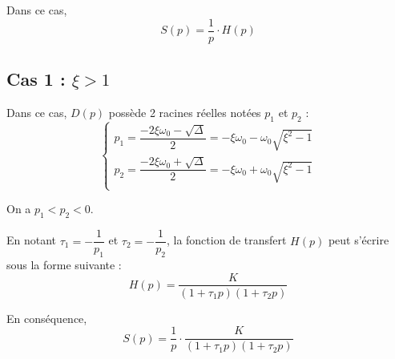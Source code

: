 \documentclass[10pt]{article}
\begin{document}
Dans ce cas, 
$$
S(p)=\dfrac{1}{p}\cdot H(p)
$$
\subsection{Cas 1 : $\xi > 1$}



Dans ce cas, $D(p)$ possède 2 racines réelles notées $p_1$ et $p_2$ :
$$
\left\{
\begin{array}{l}
p_1 =
\dfrac{-2\xi\omega_0-\sqrt{\Delta}}{2}=-\xi\omega_0-\omega_0\sqrt{\xi^2-1}\\ 
p_2 =
\dfrac{-2\xi\omega_0+\sqrt{\Delta}}{2}=-\xi\omega_0+\omega_0\sqrt{\xi^2-1}\\ 
\end{array}
\right.
$$

On a $p_1<p_2<0$.

En notant $\tau_1=-\dfrac{1}{p_1}$ et $\tau_2=-\dfrac{1}{p_2}$, la fonction de
transfert $H(p)$ peut s'écrire sous la forme suivante :  
$$
H(p)=\dfrac{K}{\left(1+ \tau_1 p \right)\left(1+ \tau_2 p  \right)}
$$

En conséquence, 
$$
S(p)=\dfrac{1}{p}\cdot\dfrac{K}{\left(1+ \tau_1 p \right)\left(1+ \tau_2 p 
\right)} 
$$
\end{document}
